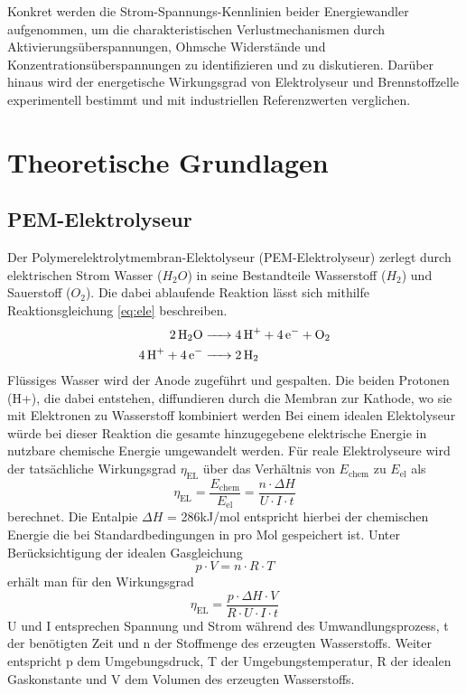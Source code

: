 \documentclass[11pt,a4paper]{article}
\numberwithin{equation}{section}
\begin{document}
\noindent Konkret werden die Strom-Spannungs-Kennlinien beider Energiewandler aufgenommen, um die charakteristischen Verlustmechanismen durch Aktivierungsüberspannungen, Ohmsche Widerstände und Konzentrationsüberspannungen zu identifizieren und zu diskutieren. Darüber hinaus wird der energetische Wirkungsgrad von Elektrolyseur und Brennstoffzelle experimentell bestimmt und mit industriellen Referenzwerten verglichen.


\section{Theoretische Grundlagen}

\subsection{PEM-Elektrolyseur}
Der Polymerelektrolytmembran-Elektolyseur (PEM-Elektrolyseur) zerlegt durch elektrischen Strom Wasser ($H_{\text{2}}O$) in seine Bestandteile Wasserstoff ($H_{\text{2}}$) und Sauerstoff ($O_{\text{2}}$). Die dabei ablaufende Reaktion l\"asst sich mithilfe Reaktionsgleichung \ref{eq:ele} beschreiben.
\begin{align}
\ce{2H2O &-> 4H+ + 4e- + O2} \nonumber \\
\ce{4H+ + 4e- &-> 2H2}
\label{eq:ele}
\end{align}
\noindent Flüssiges Wasser wird der Anode zugeführt und gespalten. Die beiden Protonen (H+), die dabei entstehen, diffundieren durch die Membran zur Kathode, wo sie mit Elektronen zu Wasserstoff kombiniert werden
Bei einem idealen Elektolyseur w\"urde bei dieser Reaktion die gesamte hinzugegebene elektrische Energie in nutzbare chemische Energie umgewandelt werden. F\"ur reale Elektrolyseure wird der tats\"achliche Wirkungsgrad $\eta_{\text{EL}}$ \"uber das Verh\"altnis von $E_{\text{chem}}$ zu $E_{\text{el}}$ als 
\begin{equation}
\eta_\text{EL} = \frac{E_\text{chem}}{E_\text{el}} = \frac{n \cdot \Delta H}{U \cdot I \cdot t}
\label{eq:wirkungBrenn}
\end{equation}
berechnet. Die Entalpie  $\Delta H$ = 286kJ/mol entspricht hierbei der chemischen Energie die bei Standardbedingungen in  pro Mol gespeichert ist. Unter Ber\"ucksichtigung der idealen Gasgleichung
\begin{equation}
p \cdot V=n \cdot R \cdot T
\label{eq:ideal}
\end{equation}
erh\"alt man f\"ur den Wirkungsgrad  
\newline
\begin{equation}
\eta_\text{EL} = \frac{p \cdot \Delta H \cdot V}{R \cdot U \cdot I \cdot t}
\label{eq:wirkungELVoll}
\end{equation}
U und I entsprechen Spannung und Strom während des Umwandlungsprozess, t der benötigten Zeit und n der Stoffmenge des erzeugten Wasserstoffs. Weiter entspricht p dem Umgebungsdruck, T der Umgebungstemperatur, R der idealen Gaskonstante und V dem Volumen des erzeugten Wasserstoffs.
\end{document}
